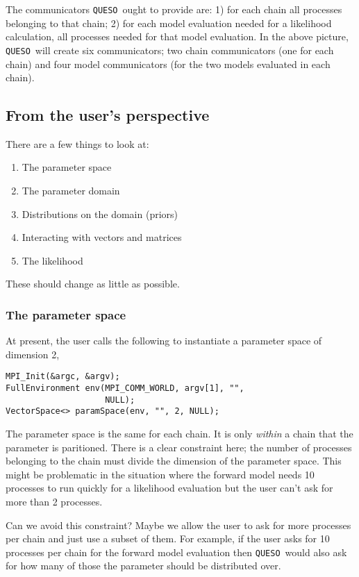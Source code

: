 \documentclass{article}
\newcommand{\Queso}{\texttt{QUESO}}
\begin{document}
The communicators \Queso\ ought to provide are: 1) for each chain all processes
belonging to that chain; 2) for each model evaluation needed for a likelihood
calculation, all processes needed for that model evaluation.  In the above
picture, \Queso\ will create six communicators; two chain communicators (one
for each chain) and four model communicators (for the two models evaluated
in each chain).

\subsection{From the user's perspective}

There are a few things to look at:
\begin{enumerate}
  \item The parameter space
  \item The parameter domain
  \item Distributions on the domain (priors)
  \item Interacting with vectors and matrices
  \item The likelihood
\end{enumerate}
These should change as little as possible.

\subsubsection{The parameter space}

At present, the user calls the following to instantiate a parameter space of
dimension 2,
\begin{lstlisting}
MPI_Init(&argc, &argv);
FullEnvironment env(MPI_COMM_WORLD, argv[1], "",
                    NULL);
VectorSpace<> paramSpace(env, "", 2, NULL);
\end{lstlisting}
The parameter space is the same for each chain.  It is only \emph{within} a
chain that the parameter is paritioned.  There is a clear constraint here; the
number of processes belonging to the chain must divide the dimension of the
parameter space.  This might be problematic in the situation where the forward
model needs 10 processes to run quickly for a likelihood evaluation but the
user can't ask for more than 2 processes.

Can we avoid this constraint?  Maybe we allow the user to ask for more
processes per chain and just use a subset of them.  For example, if the user
asks for 10 processes per chain for the forward model evaluation then \Queso\
would also ask for how many of those the parameter should be distributed over.
\end{document}
